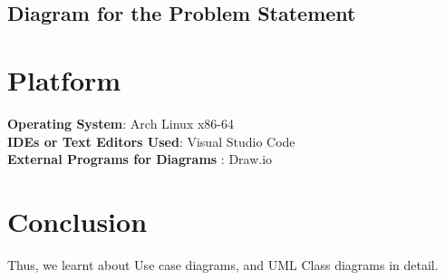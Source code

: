 \documentclass[11pt]{article}
\begin{document}
\clearpage
\subsection{Diagram for the Problem Statement}
\clearpage


\section{Platform}
\textbf{Operating System}: Arch Linux x86-64 \\
\textbf{IDEs or Text Editors Used}: Visual Studio Code\\
\textbf{External Programs for Diagrams} : Draw.io\\


\section{Conclusion}
Thus, we learnt about Use case diagrams, and UML Class diagrams in detail.
\clearpage
\end{document}
